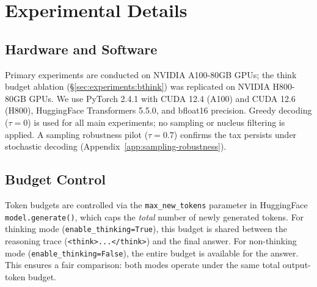 
\section{Experimental Details}
\label{app:experimental_details}

\subsection{Hardware and Software}
Primary experiments are conducted on NVIDIA A100-80GB GPUs; the think budget ablation (\S\ref{sec:experiments:bthink}) was replicated on NVIDIA H800-80GB GPUs.
We use PyTorch 2.4.1 with CUDA 12.4 (A100) and CUDA 12.6 (H800), HuggingFace Transformers 5.5.0,
and bfloat16 precision.
Greedy decoding ($\tau{=}0$) is used for all main experiments; no sampling or
nucleus filtering is applied.
A sampling robustness pilot ($\tau{=}0.7$) confirms the tax persists under stochastic decoding (Appendix~\ref{app:sampling-robustness}).

\subsection{Budget Control}
Token budgets are controlled via the \texttt{max\_new\_tokens} parameter
in HuggingFace \texttt{model.generate()}, which caps the \emph{total}
number of newly generated tokens.
For thinking mode (\texttt{enable\_thinking=True}), this budget is shared
between the reasoning trace (\texttt{<think>...</think>}) and the final
answer.
For non-thinking mode (\texttt{enable\_thinking=False}), the entire budget
is available for the answer.
This ensures a fair comparison: both modes operate under the same total
output-token budget.

